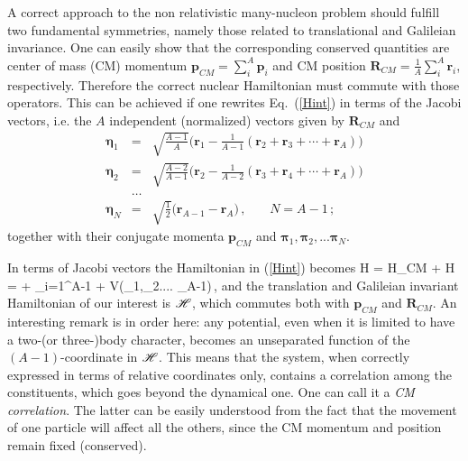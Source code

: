 A correct approach to the non relativistic many-nucleon problem  should fulfill 
two fundamental symmetries, namely those related to translational and Galileian invariance. One can easily show that the 
corresponding conserved quantities  are center of mass (CM) momentum 
$ \mathbf{p}_{CM} = \sum_i^A \mathbf{p}_i $ and CM position  $ \mathbf{R}_{CM} = \frac{1}{A}\sum_i^A \mathbf{r}_i $, respectively. 
Therefore the correct nuclear Hamiltonian must commute with those operators. This can be achieved if one rewrites  
Eq.~(\ref{Hint}) in terms of the Jacobi vectors, i.e. the $A$ independent (normalized) vectors  given by
$ \mathbf{R}_{CM}$ and  
\begin{eqnarray} \label{jacobi}
  \bm{\eta}_1 & = & \sqrt{\frac{A-1}{A}}\Big(\mathbf{r}_1 
                - \frac{1}{A-1}(\mathbf{r}_2 + \mathbf{r}_3 + \cdots
                + \mathbf{r}_{A} )\Big)  \nonumber \\
  \bm{\eta}_2 & = & \sqrt{\frac{A-2}{A-1}}\Big(\mathbf{r}_{2} 
               - \frac{1}{A-2}(\mathbf{r}_3 + \mathbf{r}_4 + \cdots
               + \mathbf{r}_{A} )\Big)  \nonumber \\
  &\ldots&  \nonumber \\ 
  \bm{\eta}_{N} & = & \sqrt{\frac{1}{2}}\Big(\mathbf{r}_{A-1}
                        - \mathbf{r}_{A} \Big) \,,\,\,\,\,\,\,\,\,\,\,\, N=A-1\,;
\end{eqnarray} 
together with their conjugate momenta $\mathbf{p}_{CM}$ and $\bm{\pi}_1, \bm{\pi}_2, ... \bm{\pi}_N$.

In terms of Jacobi vectors the Hamiltonian in (\ref{Hint}) becomes 
\be\label{Hlab}
H = H_{CM} + {\cal H} =  + \sum_{i=1}^{A-1}  + V(\bm{\eta}_1,\bm{\eta}_2.... \bm{\eta}_{A-1})\,,
\ee
and the translation and Galileian invariant Hamiltonian of our interest is ${\cal H}$, which commutes both with $ \mathbf{p}_{CM}$ and 
$ \mathbf{R}_{CM}$.
An interesting remark is in order here:
any potential, even when it is limited to have a two-(or three-)body character, becomes an unseparated function of the $(A-1)$-coordinate 
in ${\cal H}$. 
This means that the system, when correctly expressed in terms of relative coordinates only, contains a correlation among the constituents, 
which goes beyond the dynamical one. One can call it a {\it CM correlation}. The latter  can be easily understood from the fact that
the movement of one particle will affect all the others, since the CM momentum and position remain fixed (conserved).

